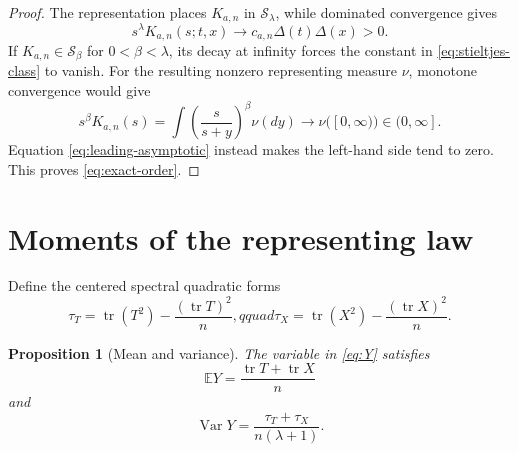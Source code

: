 \documentclass[11pt]{article}
\newtheorem{proposition}[theorem]{Proposition}
\theoremstyle{definition}
\theoremstyle{remark}
\newcommand{\E}{\mathbb{E}}
\newcommand{\cS}{\mathcal{S}}
\newcommand{\tr}{\operatorname{tr}}
\begin{document}
\begin{proof}
The representation places $K_{a,n}$ in $\cS_\lambda$, while dominated
convergence gives
\begin{equation}\label{eq:leading-asymptotic}
s^\lambda K_{a,n}(s;t,x)
\longrightarrow c_{a,n}\Delta(t)\Delta(x)>0.
\end{equation}
If $K_{a,n}\in\cS_\beta$ for $0<\beta<\lambda$, its decay at infinity forces
the constant in \eqref{eq:stieltjes-class} to vanish. For the resulting
nonzero representing measure $\nu$, monotone convergence would give
\[
s^\beta K_{a,n}(s)
=\int\left(\frac{s}{s+y}\right)^\beta\nu(dy)
\longrightarrow\nu([0,\infty))\in(0,\infty].
\]
Equation \eqref{eq:leading-asymptotic} instead makes the left-hand side tend
to zero. This proves \eqref{eq:exact-order}.
\end{proof}

\section{Moments of the representing law}

Define the centered spectral quadratic forms
\begin{equation}\label{eq:taus}
\tau_T=\tr(T^2)-\frac{(\tr T)^2}{n},qquad
\tau_X=\tr(X^2)-\frac{(\tr X)^2}{n}.
\end{equation}

\begin{proposition}[Mean and variance]
\label{prop:moments}
The variable in \eqref{eq:Y} satisfies
\begin{equation}\label{eq:mean}
\E Y=\frac{\tr T+\tr X}{n}
\end{equation}
and
\begin{equation}\label{eq:variance}
\operatorname{Var}Y
=\frac{\tau_T+\tau_X}{n(\lambda+1)}.
\end{equation}
\end{proposition}
\end{document}
